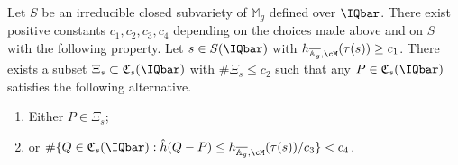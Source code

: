\begin{proposition}
\notready\label{PropAlgPtFar}
  Let $S$ be an irreducible closed subvariety of $\mathbb{M}_g$ defined over $\IQbar$. There
  exist positive constants $c_1, c_2, c_3, c_4$ depending on the choices
  made above and on $S$ with the following property. Let $s\in
  S(\IQbar)$ with $h_{\overline{\mathbb{A}_g},\cM}(\tau(s))
  \ge c_1$. There exists a subset $\Xi_s \subset \mathfrak{C}_s(\IQbar)$
  with $\#\Xi_s\le c_2$ such that any $P \in \mathfrak{C}_s(\IQbar)$
  satisfies the following alternative.
  \begin{enumerate}
  \item[(i)] Either $P \in \Xi_s$;
  \item[(ii)] or $\#\{Q \in \mathfrak{C}_s(\IQbar) : \hat{h}(Q-P) \le h_{\overline{\mathbb{A}_g},\cM}(\tau(s))/c_3\} < c_4$.
  \end{enumerate}
\end{proposition}



